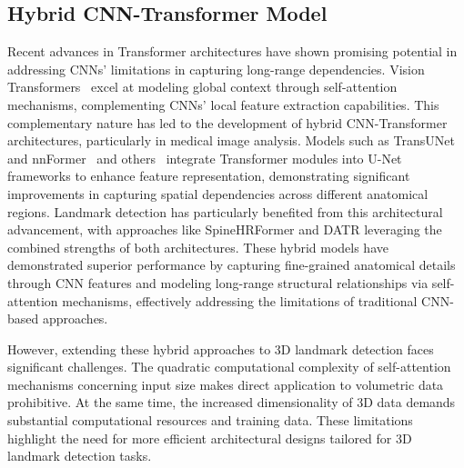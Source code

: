 \subsection{Hybrid CNN-Transformer Model}
Recent advances in Transformer architectures have shown promising potential in addressing CNNs' limitations in capturing long-range dependencies. Vision Transformers~\cite{VIT} excel at modeling global context through self-attention mechanisms, complementing CNNs' local feature extraction capabilities. This complementary nature has led to the development of hybrid CNN-Transformer architectures, particularly in medical image analysis. Models such as TransUNet~\cite{transunet} and nnFormer~\cite{nnformer} and others~\cite{MP-atten-hybrid2, MP-hybrid-2, MP-hybrid4, MP-hybrid5, MP-hybrid6, mp-CNN+ATTEn1, MP-atten-seg1, MP-U-atten3, MP-U-trans1, MP-U-trans2} integrate Transformer modules into U-Net frameworks to enhance feature representation, demonstrating significant improvements in capturing spatial dependencies across different anatomical regions. Landmark detection has particularly benefited from this architectural advancement, with approaches like SpineHRFormer \cite{SpineHRformer} and DATR \cite{DATR} leveraging the combined strengths of both architectures. These hybrid models have demonstrated superior performance by capturing fine-grained anatomical details through CNN features and modeling long-range structural relationships via self-attention mechanisms, effectively addressing the limitations of traditional CNN-based approaches.

However, extending these hybrid approaches to 3D landmark detection faces significant challenges. The quadratic computational complexity of self-attention mechanisms concerning input size makes direct application to volumetric data prohibitive. At the same time, the increased dimensionality of 3D data demands substantial computational resources and training data. These limitations highlight the need for more efficient architectural designs tailored for 3D landmark detection tasks.